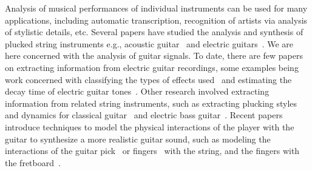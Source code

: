 \documentclass{article}
\begin{document}
Analysis of musical performances of individual instruments can be used for many applications, including automatic transcription, recognition of artists via analysis of stylistic details, etc. Several papers have studied the analysis and synthesis of plucked string instruments e.g., acoustic guitar~\cite{Karjalainen93towardshigh-quality,laurson2001methods} and electric guitars~\cite{sullivan1990extending}. We are here concerned with the analysis of guitar signals. To date, there are few papers on extracting information from electric guitar recordings, some examples being work concerned with classifying the types of effects used~\cite{abesser2012feature} and estimating the decay time of electric guitar tones~\cite{pate2014predicting}. Other research involved extracting information from related string instruments, such as extracting plucking styles and dynamics for classical guitar~\cite{erkut2000extraction} and electric bass guitar~\cite{abesser:automatic_string_detection_ml}. Recent papers introduce techniques to model the physical interactions of the player with the guitar to synthesize a more realistic guitar sound, such as modeling the interactions of the guitar pick~\cite{germain2009synthesis,evangelista2010player} or fingers~\cite{poirot_nonlinear_interactions_with_string} with the string, and the fingers with the fretboard~\cite{bilbao2015numerical}.

\end{document}
